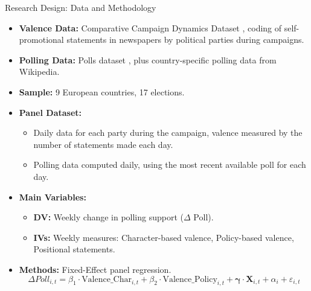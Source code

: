 \documentclass[9pt, aspectratio=169]{beamer}
\newcommand{\customcite}[1]{\textcolor{blue}{\parencite{#1}}}
\begin{document}
\begin{frame}{Research Design: Data and Methodology}
    \begin{itemize}
        \item \textbf{Valence Data:} Comparative Campaign Dynamics Dataset \customcite{debussomer-topcu2018comparative}, coding of self-promotional statements in newspapers by political parties during campaigns. \vspace{0.2cm}
        \item \textbf{Polling Data:} Polls dataset \customcite{Jennings2018}, plus country-specific polling data from Wikipedia. \vspace{0.2cm}
        \item \textbf{Sample:} 9 European countries, 17 elections. \vspace{0.2cm}
        \item \textbf{Panel Dataset:} 
        \begin{itemize}
            \item Daily data for each party during the campaign, valence measured by the number of statements made each day. \vspace{0.2cm}
            \item Polling data computed daily, using the most recent available poll for each day.
        \end{itemize} \vspace{0.2cm}
        \item \textbf{Main Variables:} 
        \begin{itemize}
            \item \textbf{DV:} Weekly change in polling support ($\Delta$ Poll). \vspace{0.2cm}
            \item \textbf{IVs:} Weekly measures: Character-based valence, Policy-based valence, Positional statements.
        \end{itemize} \vspace{0.2cm}
        \item \textbf{Methods:} Fixed-Effect panel regression. \vspace{0.2cm}
        \begin{equation*}
            \Delta Poll_{i,t} = \beta_1 \cdot \text{Valence\_Char}_{i,t} + \beta_2 \cdot \text{Valence\_Policy}_{i,t} + \boldsymbol{\gamma} \cdot \mathbf{X}_{i,t} + \alpha_i + \varepsilon_{i,t}
        \end{equation*}
    \end{itemize}
\end{frame}
\end{document}
